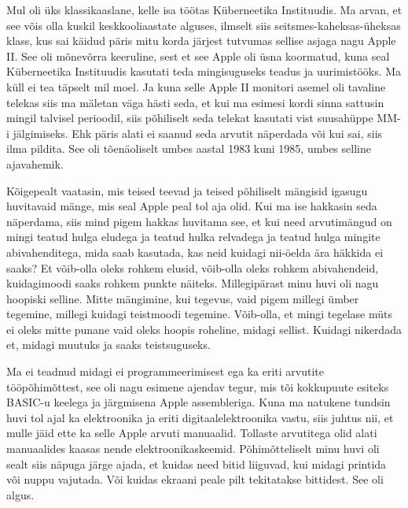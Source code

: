 

Mul oli üks klassikaaslane, kelle isa töötas Küberneetika Instituudis. Ma arvan, et see võis olla kuskil keskkooliaastate alguses, ilmselt siis seitsmes-kaheksas-üheksas klass, kus sai käidud päris mitu korda järjest tutvumas sellise asjaga nagu Apple II. See oli  mõnevõrra keeruline, sest et see Apple oli üsna koormatud, kuna seal Küberneetika Instituudis  kasutati teda mingisuguseks teadus ja uurimistööks. Ma küll ei tea täpselt mil moel. Ja kuna selle Apple II monitori asemel oli tavaline telekas siis ma mäletan väga hästi seda, et kui ma esimesi kordi sinna sattusin mingil talvisel perioodil, siis põhiliselt seda telekat kasutati vist suusahüppe MM-i jälgimiseks. Ehk päris alati ei saanud seda arvutit näperdada või kui sai, siis ilma pildita. See oli  tõenäoliselt umbes aastal 1983 kuni 1985, umbes selline ajavahemik. 


Kõigepealt vaatasin, mis teised teevad ja teised põhiliselt mängisid igasugu huvitavaid mänge, mis seal Apple peal tol aja olid. Kui ma ise hakkasin seda näperdama, siis mind pigem hakkas huvitama see, et kui need arvutimängud on mingi teatud hulga eludega ja teatud hulka relvadega ja teatud hulga mingite abivahenditega, mida saab kasutada, kas neid kuidagi nii-öelda ära häkkida ei saaks? Et võib-olla oleks rohkem elusid,  võib-olla oleks rohkem abivahendeid, kuidagimoodi saaks rohkem punkte näiteks. Millegipärast minu huvi oli nagu hoopiski selline. Mitte  mängimine, kui tegevus, vaid pigem millegi ümber tegemine, millegi kuidagi teistmoodi tegemine. Võib-olla, et mingi tegelase müts ei oleks mitte punane vaid oleks hoopis roheline, midagi sellist. Kuidagi  nikerdada  et, midagi muutuks ja saaks teistsuguseks. 

Ma ei teadnud midagi ei programmeerimisest ega ka eriti arvutite tööpõhimõttest, see oli nagu esimene ajendav tegur, mis tõi kokkupuute esiteks BASIC-u keelega ja järgmisena Apple assembleriga. Kuna ma natukene tundsin huvi tol ajal ka elektroonika ja eriti digitaalelektroonika vastu, siis juhtus nii, et mulle jäid ette ka selle Apple arvuti manuaalid. Tollaste arvutitega olid alati manuaalides kaasas nende elektroonikaskeemid. Põhimõtteliselt minu huvi oli sealt siis  näpuga järge ajada,  et kuidas need bitid liiguvad, kui midagi printida või nuppu vajutada. Või kuidas ekraani peale pilt tekitatakse bittidest. See oli algus.


